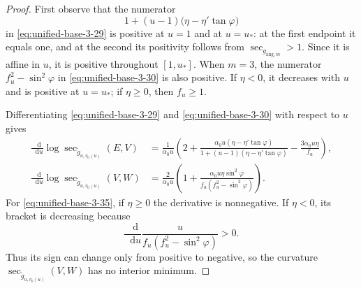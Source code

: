 \documentclass[11pt,reqno]{amsart}
\theoremstyle{definition}
\numberwithin{equation}{section}
\newcommand{\dd}{\mathop{}\!\mathrm d}
\begin{document}
\begin{proof}
First observe that the numerator
\[
 1+(u-1)\bigl(\eta-\eta'\tan\varphi\bigr)
\]
in \eqref{eq:unified-base-3-29} is positive at $u=1$ and at $u=u_*$:
at the first endpoint it equals one, and at the second its positivity
follows from $\sec_{g_{\mathrm{ang},m}}>1$.  Since it is affine in
$u$, it is positive throughout $[1,u_*]$.  When $m=3$, the numerator
$f_u^2-\sin^2\varphi$ in \eqref{eq:unified-base-3-30} is also
positive.  If $\eta<0$, it decreases with $u$ and is positive at
$u=u_*$; if $\eta\ge0$, then $f_u\ge1$.

Differentiating \eqref{eq:unified-base-3-29} and \eqref{eq:unified-base-3-30} with respect to $u$ gives
\begin{align}
 \frac{\dd}{\dd u}\log\sec_{\widetilde g_{u,v_0(u)}}(E,V)
 &=\frac1{\alpha_0u}\left(
  2+\frac{\alpha_0u(\eta-\eta'\tan\varphi)}
           {1+(u-1)(\eta-\eta'\tan\varphi)}
   -\frac{3\alpha_0u\eta}{f_u}\right),                           \label{eq:unified-base-3-34}\\
 \frac{\dd}{\dd u}\log\sec_{\widetilde g_{u,v_0(u)}}(V,W)
 &=\frac2{\alpha_0u}\left(
  1+\frac{\alpha_0u\eta\sin^2\varphi}
          {f_u(f_u^2-\sin^2\varphi)}\right).                     \label{eq:unified-base-3-35}
\end{align}
For \eqref{eq:unified-base-3-35}, if $\eta\ge0$ the derivative is
nonnegative.  If $\eta<0$, its bracket is decreasing because
\[
 \frac{\dd}{\dd u}\frac{u}{f_u(f_u^2-\sin^2\varphi)}>0.
\]
Thus its sign can change only from positive to negative, so the
curvature $\sec_{\widetilde g_{u,v_0(u)}}(V,W)$ has no interior minimum.


\end{proof}
\end{document}
